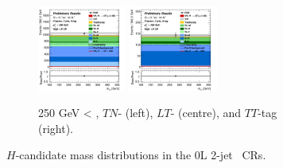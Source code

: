 \begin{figure}[h!]
\begin{subfigure}[b]{\textwidth}
        \includegraphics[width=0.32\textwidth]{Images/VH/Own_fit/postfit_VHcc/Region_distmBB_BMin250_DCRHigh_J2_TTypelt_T2_L0_Y6051_GlobalFit_conditionnal_mu1.png}
        \includegraphics[width=0.32\textwidth]{Images/VH/Own_fit/postfit_VHcc/Region_distmBB_BMin250_DCRHigh_J2_TTypett_T2_L0_Y6051_GlobalFit_conditionnal_mu1.png}
        \caption{250 GeV < \ptv, $TN$- (left), $LT$- (centre), and $TT$-tag (right).}
        \label{fig:plots_VHcc_OL_250_CRH_2c_2J}
    \end{subfigure}
    \caption{$H$-candidate mass distributions in the 0L 2-jet \highdr\ CRs.}
    \label{fig:plots_VHcc_OL_CRH_2c_2J}
\end{figure} 
